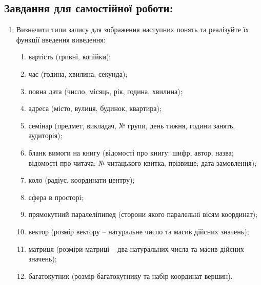 \documentclass[a5paper,titlepage,openany,twoside,
]
{book_unv}%
\makeatletter
\newcommand{\xslalph}[1]{\expandafter\@xslalph\csname c@#1\endcsname}
\newcommand{\@xslalph}[1]{%
    \ifcase#1\or а\or б\or в\or г\or д\or e\or є\or ж\or з\or i%
    \or й\or к\or л\or м\or н\or о\or п\or р\or с\or т%
    \or у\or ф\or х\or ц\or ч\or ш\or ю\or я\or аа\or бб\or вв%
    \else\@ctrerr\fi%
}
\makeatother
\begin{document}
\begin{enumerate}
\section{Завдання для самостійної роботи:}

\begin{enumerate}
\def\labelenumi{\arabic{enumi})}
\setcounter{enumi}{5}
\item
 Визначити типи запису для зображення наступних понять та реалізуйте
їх функції введення виведення:
\begin{enumerate}[label=\xslalph*)]
\item вартість (гривні, копійки);
\item час (година, хвилина, секунда);
\item повна дата (число, місяць, рік, година, хвилина);
\item адреса (місто, вулиця, будинок, квартира);
\item семінар (предмет, викладач, № групи, день тижня, години занять, аудиторія);
\item бланк вимоги на книгу (відомості про книгу: шифр, автор, назва;
відомості про читача: № читацького квитка, прізвище; дата замовлення);
\item коло (радіус, координати центру);
\item сфера в просторі;
\item прямокутний паралеліпипед (сторони якого паралельні вісям координат);
\item вектор (розмір вектору -- натуральне число та масив дійсних значень);
\item матриця (розміри матриці -- два натуральних числа та масив дійсних значень);
\item багатокутник (розмір багатокутнику та набір координат вершин).


\end{enumerate}


\end{enumerate}
\end{enumerate}
\end{document}
